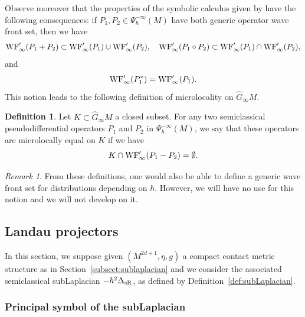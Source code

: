\documentclass[12pt,a4paper]{amsart}
\theoremstyle{plain}
\theoremstyle{definition}
\newtheorem{definition}[theorem]{Definition}
\theoremstyle{remark}
\newtheorem{remark}[theorem]{Remark}
\numberwithin{equation}{section}
\theoremstyle{definition}
\def \Ghat{\widehat{G}}
\numberwithin{equation}{section}
\begin{document}
Observe moreover that the properties of the symbolic calculus given by \cite[Proposition 2.8-2.9]{BFF25} have the following consequences: if $P_1, P_2\in \Psi_\hbar^{-\infty}(M)$ have both generic operator wave front set, then we have
\begin{equation*}
    {\rm WF}'_\infty(P_1+P_2)\subset{\rm WF}'_\infty(P_1)\cup {\rm WF}'_\infty(P_2),\quad {\rm WF}'_\infty(P_1\circ P_2) \subset {\rm WF}'_\infty(P_1)\cap {\rm WF}'_\infty(P_2),
\end{equation*}
and 
\begin{equation*}
    {\rm WF}'_\infty(P_1^*) = {\rm WF}'_\infty(P_1).
\end{equation*}
This notion leads to the following definition of microlocality on $\Ghat_\infty M$.

\begin{definition}
    \label{def:microlocality}
    Let $K\subset \Ghat_\infty M$ a closed subset. For any two semiclassical pseudodifferential operators $P_1$ and $P_2$ in $\Psi_\hbar^{-\infty}(M)$, we say that these operators are microlocally equal on $K$ if we have
    \begin{equation*}
        K\cap {\rm WF}'_\infty(P_1-P_2) = \emptyset.
    \end{equation*}
\end{definition}

\begin{remark}
    From these definitions, one would also be able to define a generic wave front set for distributions depending on $\hbar$. However, we will have no use for this notion and we will not develop on it.
\end{remark}

\subsection{Landau projectors}
\label{subsect:Landauproj}

In this section, we suppose given $(M^{2d+1},\eta,g)$ a compact contact metric structure as in Section~\ref{subsect:sublaplacian} and we consider the associated semiclassical subLaplacian $-\hbar^2\Delta_{\rm sR}$, as defined by Definition~\ref{def:subLaplacian}.

\subsubsection{Principal symbol of the subLaplacian}
\end{document}
